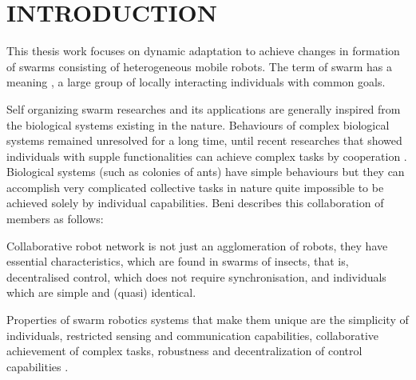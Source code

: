 

\chapter{INTRODUCTION}
\label{chp:introduction}

This thesis work focuses on dynamic adaptation to achieve changes in formation of swarms consisting of heterogeneous mobile robots. The term of swarm has a meaning \cite{4}, a large group of locally interacting individuals with common goals. 

Self organizing swarm researches and its applications are generally inspired from the biological systems existing in the nature. Behaviours of complex biological systems remained unresolved for a long time, until recent researches that showed individuals with supple functionalities can achieve complex tasks by cooperation \cite{2}. Biological systems (such as colonies of ants) have simple behaviours but they can accomplish very complicated collective tasks in nature quite impossible to be achieved solely by individual capabilities. Beni \cite{1} describes this collaboration of members as follows:

Collaborative robot network is not just an agglomeration of robots, they have essential characteristics, which are found in swarms of insects, that is, decentralised control, which does not require synchronisation, and individuals which are simple and (quasi) identical.

Properties of swarm robotics systems that make them unique are the simplicity of individuals, restricted sensing and communication capabilities, collaborative achievement of complex tasks, robustness and decentralization of control capabilities \cite{6}.

